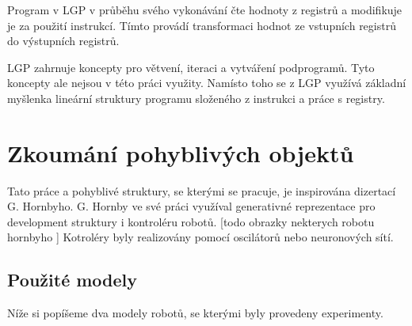 Program v LGP v průběhu svého vykonávání čte hodnoty z registrů a modifikuje je za použití instrukcí.
Tímto provádí transformaci hodnot ze vstupních registrů do výstupních registrů.

LGP zahrnuje koncepty pro větvení, iteraci a vytváření podprogramů.
Tyto koncepty ale nejsou v této práci využity.
Namísto toho se z LGP využívá základní myšlenka lineární struktury programu složeného z instrukci a práce s registry.



\chapter{Zkoumání pohyblivých objektů}



Tato práce a pohyblivé struktury, se kterými se pracuje, je inspirována dizertací G. Hornbyho.
G. Hornby ve své práci využíval generativné reprezentace pro development struktury i kontroléru robotů.
[todo obrazky nekterych robotu hornbyho ]
Kotroléry byly realizovány pomocí oscilátorů nebo neuronových sítí.



\section{Použité modely}
Níže si popíšeme dva modely robotů, se kterými byly provedeny experimenty.

